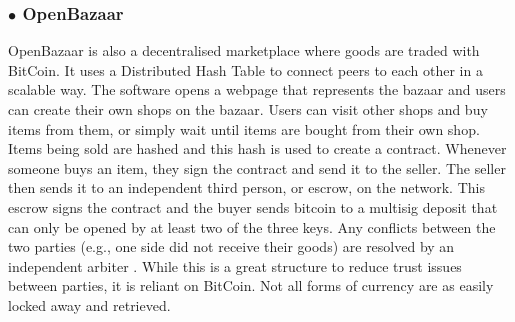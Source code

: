\subsubsection*{$\bullet$ OpenBazaar}
OpenBazaar \cite{bazaar} is also a decentralised marketplace where goods are traded with BitCoin.
It uses a Distributed Hash Table to connect peers to each other in a scalable way.
The software opens a webpage that represents the bazaar and users can create their own shops on the bazaar.
Users can visit other shops and buy items from them, or simply wait until items are bought from their own shop.
Items being sold are hashed and this hash is used to create a contract.
Whenever someone buys an item, they sign the contract and send it to the seller.
The seller then sends it to an independent third person, or escrow, on the network.
This escrow signs the contract and the buyer sends bitcoin to a multisig deposit that can only be opened by at least two of the three keys.
Any conflicts between the two parties (e.g., one side did not receive their goods) are resolved by an independent arbiter \cite{bazaarDisputeResolution}.
While this is a great structure to reduce trust issues between parties, it is reliant on BitCoin.
Not all forms of currency are as easily locked away and retrieved.